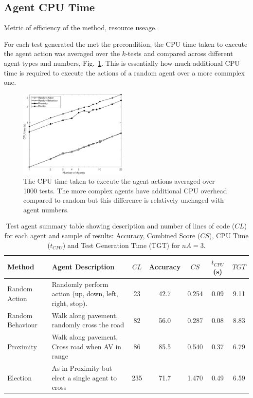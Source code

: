 \documentclass[letterpaper, 10 pt, journal, twoside]{IEEEtran}
\begin{document}
\subsection{Agent CPU Time}
Metric of efficiency of the method, resource useage.

For each test generated the met the precondition, the CPU time taken to execute the agent action was averaged over the $k$-tests and compared across different agent types and numbers, Fig.~\ref{CPUTime}. This is essentially how much additional CPU time is required to execute the actions of a random agent over a more commplex one.

\begin{figure}[!t]
	\centering
\includegraphics[width=0.48\textwidth]{TimeCPU_log.pdf}
	\caption{The CPU time taken to execute the agent actions averaged over 1000 tests. The more complex agents have additional CPU overhead compared to random but this difference is relatively unchaged with agent numbers.}
	\label{CPUTime}
\end{figure}


\begin{table}
\centering
\caption{Test agent summary table showing description and number of lines of code ($CL$) for each agent and sample of results: Accuracy, Combined Score ($CS$), CPU Time ($t_{CPU}$) and Test Generation Time (TGT) for $nA=3$.}
\label{ResultsTable}
\begin{tabular}{|l|p{6.2cm}|c||c|c|c|c|}
\hline
\textbf{Method} & \textbf{Agent Description} & $CL$ & Accuracy & $CS$ &  $t_{CPU}$ (s) & $TGT$ \\
\hline
Random Action & Randomly perform action (up, down, left, right, stop). 	&  23& 42.7 & 0.254 & 0.09 & 9.11 \\
Random Behaviour & Walk along pavement, randomly cross the road 		&  82& 56.0 & 0.287 & 0.08 & 8.83 \\
Proximity & Walk along pavement, Cross road when AV in range 			&  86& 85.5 & 0.540 & 0.37 & 6.79 \\
Election & As in Proximity but elect a single agent to cross 			& 235& 71.7 & 1.470 & 0.49 & 6.59 \\
\hline 
\end{tabular}
\end{table}
\end{document}
